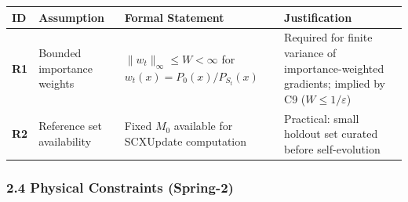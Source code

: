 \documentclass[
  12pt,
]{ctexart}
\begin{document}
\begin{longtable}[]{@{}
  >{\raggedright\arraybackslash}p{}
  >{\raggedright\arraybackslash}p{}
  >{\raggedright\arraybackslash}p{}
  >{\raggedright\arraybackslash}p{}@{}}
\toprule\noalign{}
\begin{minipage}[b]{\linewidth}\raggedright
ID
\end{minipage} & \begin{minipage}[b]{\linewidth}\raggedright
Assumption
\end{minipage} & \begin{minipage}[b]{\linewidth}\raggedright
Formal Statement
\end{minipage} & \begin{minipage}[b]{\linewidth}\raggedright
Justification
\end{minipage} \\
\midrule\noalign{}
\endhead
\bottomrule\noalign{}
\endlastfoot
\textbf{R1} & Bounded importance weights &
\(\|w_t\|_\infty \leq W < \infty\) for \(w_t(x) = P_0(x)/P_{S_t}(x)\) &
Required for finite variance of importance-weighted gradients; implied
by C9 (\(W \leq 1/\varepsilon\)) \\
\textbf{R2} & Reference set availability & Fixed \(M_0\) available for
SCXUpdate computation & Practical: small holdout set curated before
self-evolution \\
\end{longtable}

\subsubsection{2.4 Physical Constraints
(Spring-2)}\label{physical-constraints-spring-2}
\end{document}
